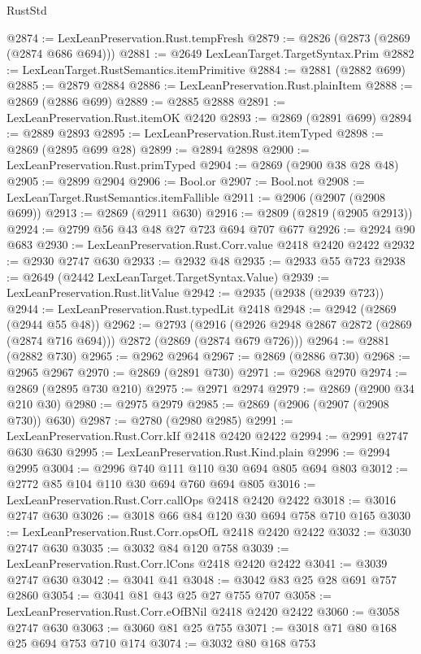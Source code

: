 \begin{lexlean}{RustStd}
\begin{coremodule}
@2874 := LexLeanPreservation.Rust.tempFresh
@2879 := @2826 (@2873 (@2869 (@2874 @686 @694)))
@2881 := @2649 LexLeanTarget.TargetSyntax.Prim
@2882 := LexLeanTarget.RustSemantics.itemPrimitive
@2884 := @2881 (@2882 @699)
@2885 := @2879 @2884
@2886 := LexLeanPreservation.Rust.plainItem
@2888 := @2869 (@2886 @699)
@2889 := @2885 @2888
@2891 := LexLeanPreservation.Rust.itemOK @2420
@2893 := @2869 (@2891 @699)
@2894 := @2889 @2893
@2895 := LexLeanPreservation.Rust.itemTyped
@2898 := @2869 (@2895 @699 @28)
@2899 := @2894 @2898
@2900 := LexLeanPreservation.Rust.primTyped
@2904 := @2869 (@2900 @38 @28 @48)
@2905 := @2899 @2904
@2906 := Bool.or
@2907 := Bool.not
@2908 := LexLeanTarget.RustSemantics.itemFallible
@2911 := @2906 (@2907 (@2908 @699))
@2913 := @2869 (@2911 @630)
@2916 := @2809 (@2819 (@2905 @2913))
@2924 := @2799 @56 @43 @48 @27 @723 @694 @707 @677
@2926 := @2924 @90 @683
@2930 := LexLeanPreservation.Rust.Corr.value @2418 @2420 @2422
@2932 := @2930 @2747 @630
@2933 := @2932 @48
@2935 := @2933 @55 @723
@2938 := @2649 (@2442 LexLeanTarget.TargetSyntax.Value)
@2939 := LexLeanPreservation.Rust.litValue
@2942 := @2935 (@2938 (@2939 @723))
@2944 := LexLeanPreservation.Rust.typedLit @2418
@2948 := @2942 (@2869 (@2944 @55 @48))
@2962 := @2793
    (@2916 (@2926 @2948 @2867 @2872 (@2869 (@2874 @716 @694))) @2872 (@2869 (@2874 @679 @726)))
@2964 := @2881 (@2882 @730)
@2965 := @2962 @2964
@2967 := @2869 (@2886 @730)
@2968 := @2965 @2967
@2970 := @2869 (@2891 @730)
@2971 := @2968 @2970
@2974 := @2869 (@2895 @730 @210)
@2975 := @2971 @2974
@2979 := @2869 (@2900 @34 @210 @30)
@2980 := @2975 @2979
@2985 := @2869 (@2906 (@2907 (@2908 @730)) @630)
@2987 := @2780 (@2980 @2985)
@2991 := LexLeanPreservation.Rust.Corr.kIf @2418 @2420 @2422
@2994 := @2991 @2747 @630 @630
@2995 := LexLeanPreservation.Rust.Kind.plain
@2996 := @2994 @2995
@3004 := @2996 @740 @111 @110 @30 @694 @805 @694 @803
@3012 := @2772 @85 @104 @110 @30 @694 @760 @694 @805
@3016 := LexLeanPreservation.Rust.Corr.callOps @2418 @2420 @2422
@3018 := @3016 @2747 @630
@3026 := @3018 @66 @84 @120 @30 @694 @758 @710 @165
@3030 := LexLeanPreservation.Rust.Corr.opsOfL @2418 @2420 @2422
@3032 := @3030 @2747 @630
@3035 := @3032 @84 @120 @758
@3039 := LexLeanPreservation.Rust.Corr.lCons @2418 @2420 @2422
@3041 := @3039 @2747 @630
@3042 := @3041 @41
@3048 := @3042 @83 @25 @28 @691 @757 @2860
@3054 := @3041 @81 @43 @25 @27 @755 @707
@3058 := LexLeanPreservation.Rust.Corr.eOfBNil @2418 @2420 @2422
@3060 := @3058 @2747 @630
@3063 := @3060 @81 @25 @755
@3071 := @3018 @71 @80 @168 @25 @694 @753 @710 @174
@3074 := @3032 @80 @168 @753

\end{coremodule}
\end{lexlean}
